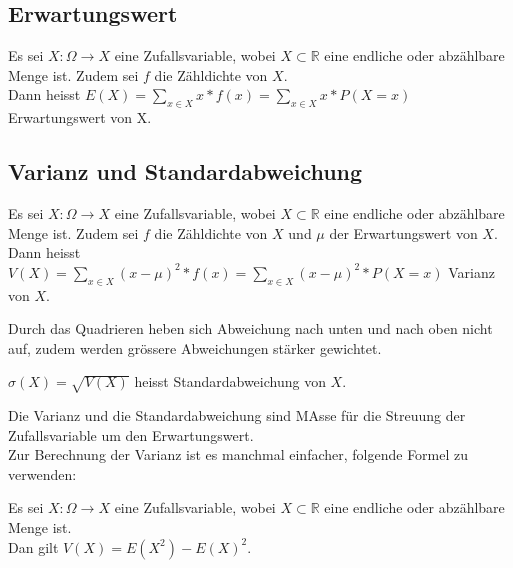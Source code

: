 \documentclass[10pt]{article}
\newtheorem[M]{definition}{Def.}
\newtheorem[M]{satz}{Satz}
\numberwithin{equation}{section}
\newcommand{\RN}{\mathbb{R}} %
\begin{document}
\subsection{Erwartungswert}
\begin{definition}[Erwartungswert]
Es sei $X : \Omega \rightarrow X$ eine Zufallsvariable, wobei $X \subset \RN$ eine endliche oder abzählbare Menge ist. Zudem sei $f$ die Zähldichte von $X$. \\
Dann heisst $E(X)=\sum_{x \in X} x * f(x)=\sum_{x \in X} x * P(X = x)$ Erwartungswert von X.
\end{definition}

\subsection{Varianz und Standardabweichung}
\begin{definition}[Varianz]
Es sei $X : \Omega \rightarrow X$ eine Zufallsvariable, wobei $X \subset \RN$ eine endliche oder abzählbare Menge ist. Zudem sei $f$ die Zähldichte von $X$ und $\mu$ der Erwartungswert von $X$. \\
Dann heisst $V(X) = \sum_{x \in X} (x - \mu)^2 * f(x) = \sum_{x \in X} (x - \mu)^2 * P(X=x)$ Varianz von $X$.
\end{definition}
Durch das Quadrieren heben sich Abweichung nach unten und nach oben nicht auf, zudem werden grössere Abweichungen stärker gewichtet. \\
\begin{definition}[Standardabweichung]
$\sigma(X) = \sqrt{V(X)}$ heisst Standardabweichung von $X$.\\
\end{definition}
Die Varianz und die Standardabweichung sind MAsse für die Streuung der Zufallsvariable um den Erwartungswert. \\
Zur Berechnung der Varianz ist es manchmal einfacher, folgende Formel zu verwenden:
\begin{satz}
Es sei $X : \Omega \rightarrow X$ eine Zufallsvariable, wobei $X \subset \RN$ eine endliche oder abzählbare Menge ist. \\
Dan gilt $V(X) = E(X^2)-E(X)^2$.
\end{satz}

\newpage
\end{document}
